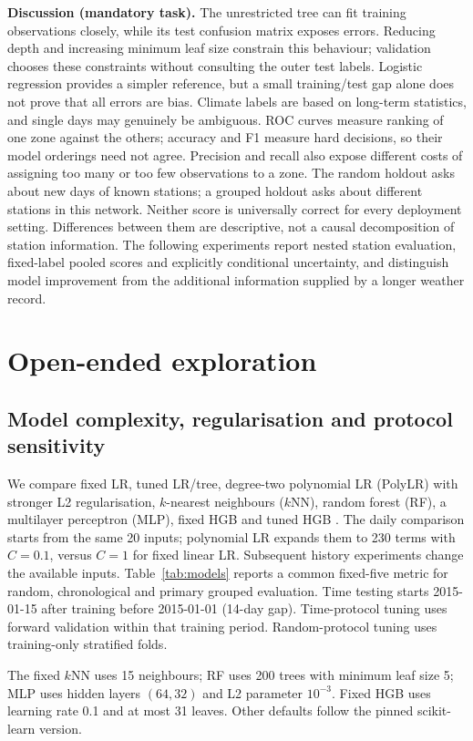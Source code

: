 \documentclass{article}
\begin{document}
\textbf{Discussion (mandatory task).} The unrestricted tree can fit training observations closely, while its test confusion matrix exposes errors. Reducing depth and increasing minimum leaf size constrain this behaviour; validation chooses these constraints without consulting the outer test labels. Logistic regression provides a simpler reference, but a small training/test gap alone does not prove that all errors are bias. Climate labels are based on long-term statistics, and single days may genuinely be ambiguous. ROC curves measure ranking of one zone against the others; accuracy and F1 measure hard decisions, so their model orderings need not agree. Precision and recall also expose different costs of assigning too many or too few observations to a zone. The random holdout asks about new days of known stations; a grouped holdout asks about different stations in this network. Neither score is universally correct for every deployment setting. Differences between them are descriptive, not a causal decomposition of station information. The following experiments report nested station evaluation, fixed-label pooled scores and explicitly conditional uncertainty, and distinguish model improvement from the additional information supplied by a longer weather record.
\FloatBarrier

\section{Open-ended exploration}
\subsection{Model complexity, regularisation and protocol sensitivity}
We compare fixed LR, tuned LR/tree, degree-two polynomial LR (PolyLR) with stronger L2 regularisation, $k$-nearest neighbours ($k$NN), random forest (RF), a multilayer perceptron (MLP), fixed HGB and tuned HGB \citep{rf,boost}. The daily comparison starts from the same 20 inputs; polynomial LR expands them to 230 terms with $C=0.1$, versus $C=1$ for fixed linear LR. Subsequent history experiments change the available inputs. Table~\ref{tab:models} reports a common fixed-five metric for random, chronological and primary grouped evaluation. Time testing starts 2015-01-15 after training before 2015-01-01 (14-day gap). Time-protocol tuning uses forward validation within that training period. Random-protocol tuning uses training-only stratified folds.

The fixed $k$NN uses 15 neighbours; RF uses 200 trees with minimum leaf size 5; MLP uses hidden layers $(64,32)$ and L2 parameter $10^{-3}$. Fixed HGB uses learning rate 0.1 and at most 31 leaves. Other defaults follow the pinned scikit-learn version.
\end{document}
